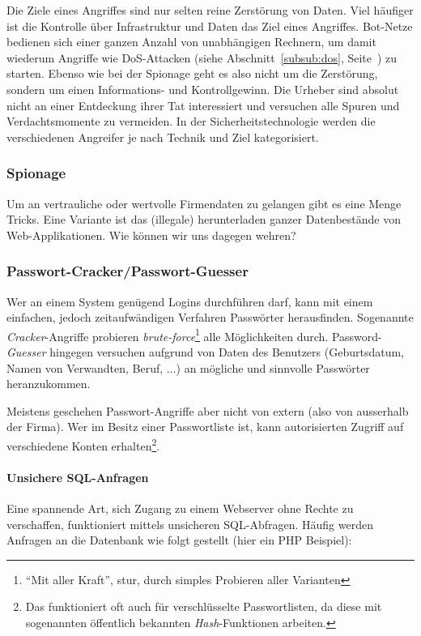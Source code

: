Die Ziele eines Angriffes sind nur selten reine Zerstörung von Daten. Viel
häufiger ist die Kontrolle über Infrastruktur und Daten das Ziel eines
Angriffes. Bot-Netze bedienen sich einer ganzen Anzahl von unabhängigen
Rechnern, um damit wiederum Angriffe wie DoS-Attacken (siehe Abschnitt~\ref{subsub:dos},
Seite~\pageref{subsub:dos}) zu starten. Ebenso
wie bei der Spionage geht es also nicht um die Zerstörung, sondern um
einen Informations- und Kontrollgewinn. Die Urheber sind absolut nicht
an einer Entdeckung ihrer Tat interessiert und versuchen alle Spuren und
Verdachtsmomente zu vermeiden. In der Sicherheitstechnologie werden die
verschiedenen Angreifer je nach Technik und Ziel kategorisiert.

\subsubsection*{Spionage}

Um an vertrauliche oder wertvolle Firmendaten zu gelangen gibt es eine Menge
Tricks. Eine Variante ist das (illegale) herunterladen ganzer Datenbestände
von Web-Applikationen. Wie können wir uns dagegen wehren?

\subsubsection*{Passwort-Cracker/Passwort-Guesser}

Wer an einem System genügend Logins durchführen darf, kann mit einem einfachen,
jedoch zeitaufwändigen Verfahren Passwörter herausfinden. Sogenannte
\emph{Cracker}-Angriffe probieren \emph{brute-force}\footnote{``Mit aller Kraft'',
stur, durch simples Probieren aller Varianten}
alle Möglichkeiten durch. Password-\emph{Guesser} hingegen versuchen aufgrund
von Daten des Benutzers (Geburtsdatum, Namen von Verwandten, Beruf, $\ldots$)
an mögliche und sinnvolle Passwörter heranzukommen.

Meistens geschehen Passwort-Angriffe aber nicht von extern (also von ausserhalb
der Firma). Wer im Besitz einer Passwortliste ist, kann autorisierten Zugriff
auf verschiedene Konten erhalten\footnote{Das funktioniert oft auch für
verschlüsselte Passwortlisten, da diese mit sogenannten öffentlich bekannten
\emph{Hash}-Funktionen arbeiten.}.

\paragraph*{Unsichere SQL-Anfragen}
Eine spannende Art, sich Zugang zu einem Webserver ohne Rechte zu verschaffen,
funktioniert mittels unsicheren SQL-Abfragen. Häufig werden Anfragen an die
Datenbank wie folgt gestellt (hier ein PHP Beispiel):

